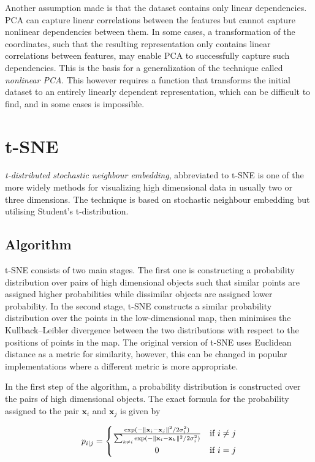 Another assumption made is that the dataset contains only linear dependencies. PCA can capture linear correlations between the features but cannot capture nonlinear dependencies between them. In some cases, a transformation of the coordinates, such that the resulting representation only contains linear correlations between features, may enable PCA to successfully capture such dependencies. This is the basis for a generalization of the technique called \textit{nonlinear PCA}\cite{bib:nonlinpca}. This however requires a function that transforms the initial dataset to an entirely linearly dependent representation, which can be difficult to find, and in some cases is impossible.

\section{t-SNE}\label{sec:t-sne}

\textit{t-distributed stochastic neighbour embedding}\cite{bib:tsne}, abbreviated to t-SNE is one of the more widely methods for visualizing high dimensional data in usually two or three dimensions. The technique is based on stochastic neighbour embedding\cite{bib:sne} but utilising Student's t-distribution.

\subsection{Algorithm}

t-SNE consists of two main stages. The first one is constructing a probability distribution over pairs of high dimensional objects such that similar points are assigned higher probabilities while dissimilar objects are assigned lower probability. In the second stage, t-SNE constructs a similar probability distribution over the points in the low-dimensional map, then minimises the  Kullback–Leibler divergence\cite{bib:kldiv} between the two distributions with respect to the positions of points in the map. The original version of t-SNE uses Euclidean distance as a metric for similarity, however, this can be changed in popular implementations where a different metric is more appropriate.

In the first step of the algorithm, a probability distribution is constructed over the pairs of high dimensional objects. The exact formula for the probability assigned to the pair $\mathbf{x}_i$ and $\mathbf{x}_j$ is given by

\begin{equation}
	\label{eq:tsne:pi|j}
	p_{i|j} =
	\begin{cases}
		{\frac {\exp(-\lVert \mathbf {x} _{i}-\mathbf {x} _{j}\rVert ^{2}/2\sigma _{i}^{2})}{\sum _{k\neq i}\exp(-\lVert \mathbf {x} _{i}-\mathbf {x} _{k}\rVert ^{2}/2\sigma _{i}^{2})}} & \textrm{if } i \neq j \\
		\hfil 0 & \textrm{if } i = j
	\end{cases}
\end{equation}

